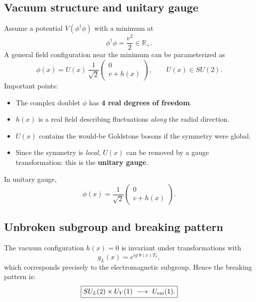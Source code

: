 \subsection{Vacuum structure and unitary gauge}
Assume a potential $V(\phi^\dagger\phi)$ with a minimum at
\begin{equation}
\boxed{
\phi^\dagger\phi=\frac{v^2}{2}\in\mathbb R_+.
}
\label{eq:vev}
\end{equation}
A general field configuration near the minimum can be parameterized as
\begin{equation}
\phi(x) = U(x)\,\frac{1}{\sqrt{2}}
\begin{pmatrix}
0\\
v+h(x)
\end{pmatrix},
\qquad U(x)\in SU(2).
\label{eq:phi-U}
\end{equation}
Important points:
\begin{itemize}
  \item The complex doublet $\phi$ has \textbf{4 real degrees of freedom}.
  \item $h(x)$ is a real field describing fluctuations \emph{along} the radial direction.
  \item $U(x)$ contains the would-be Goldstone bosons if the symmetry were global.
  \item Since the symmetry is \emph{local}, $U(x)$ can be removed by a gauge transformation:
        this is the \textbf{unitary gauge}.
\end{itemize}
In unitary gauge,
\begin{equation}
\boxed{
\phi(x)=\frac{1}{\sqrt{2}}
\begin{pmatrix}
0\\
v+h(x)
\end{pmatrix}.
}
\label{eq:unitary-gauge}
\end{equation}

\subsection{Unbroken subgroup and breaking pattern}
The vacuum configuration $h(x)=0$ is invariant under transformations with
\[
g_L(x)=e^{ig'\theta(x)T_3},
\]
which corresponds precisely to the electromagnetic subgroup.
Hence the breaking pattern is:
\begin{equation}
\boxed{
SU_L(2)\times U_Y(1)\ \longrightarrow\ U_{\rm em}(1).
}
\label{eq:SSB-pattern}
\end{equation}

